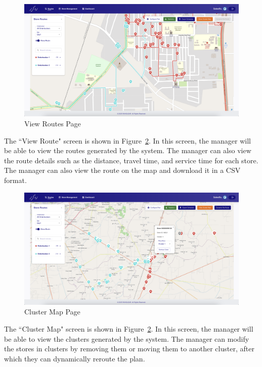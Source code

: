 \begin{figure}[H]
    \centering
    \includegraphics[width=1\textwidth]{images/plan.png} %
    \caption{View Routes Page}
    \label{fig:image6}
\end{figure}
The ``View Route" screen is shown in Figure~\ref{fig:image6}. In this screen, the manager will be able to view the routes generated by the system. The manager can also view the route details such as the distance, travel time, and service time for each store. The manager can also view the route on the map and download it in a CSV format.

\begin{figure}[H]
    \centering
    \includegraphics[width=1\textwidth]{images/Clustermap.png} %
    \caption{Cluster Map Page}
    \label{fig:image6}
\end{figure}
The ``Cluster Map" screen is shown in Figure~\ref{fig:image6}. In this screen, the manager will be able to view the clusters generated by the system. The manager can modify the stores in clusters by removing them or moving them to another cluster, after which they can dynamically reroute the plan.


